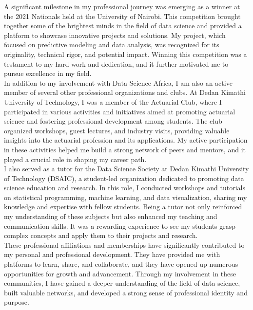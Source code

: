 \documentclass[12pt,a4paper,sans,english]{report}
\begin{document}
\noindent A significant milestone in my professional journey was emerging as a winner at the 2021 Nationals held at the University of Nairobi. This competition brought together some of the brightest minds in the field of data science and provided a platform to showcase innovative projects and solutions. My project, which focused on predictive modeling and data analysis, was recognized for its originality, technical rigor, and potential impact. Winning this competition was a testament to my hard work and dedication, and it further motivated me to pursue excellence in my field.\\

\noindent In addition to my involvement with Data Science Africa, I am also an active member of several other professional organizations and clubs. At Dedan Kimathi University of Technology, I was a member of the Actuarial Club, where I participated in various activities and initiatives aimed at promoting actuarial science and fostering professional development among students. The club organized workshops, guest lectures, and industry visits, providing valuable insights into the actuarial profession and its applications. My active participation in these activities helped me build a strong network of peers and mentors, and it played a crucial role in shaping my career path.\\

\noindent I also served as a tutor for the Data Science Society at Dedan Kimathi University of Technology (DSAIC), a student-led organization dedicated to promoting data science education and research. In this role, I conducted workshops and tutorials on statistical programming, machine learning, and data visualization, sharing my knowledge and expertise with fellow students. Being a tutor not only reinforced my understanding of these subjects but also enhanced my teaching and communication skills. It was a rewarding experience to see my students grasp complex concepts and apply them to their projects and research.\\

\noindent These professional affiliations and memberships have significantly contributed to my personal and professional development. They have provided me with platforms to learn, share, and collaborate, and they have opened up numerous opportunities for growth and advancement. Through my involvement in these communities, I have gained a deeper understanding of the field of data science, built valuable networks, and developed a strong sense of professional identity and purpose.\\
\end{document}
